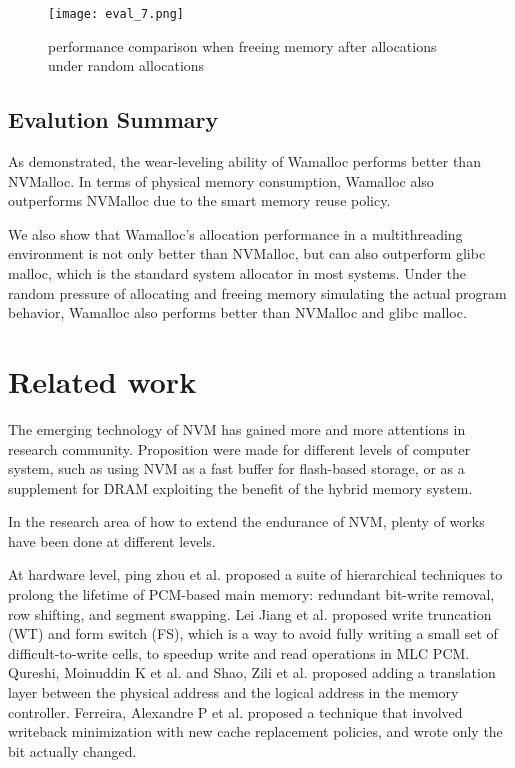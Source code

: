 \documentclass[10pt, conference, compsocconf]{IEEEtran}
\begin{document}
\begin{figure}[t]
\centering
\texttt{[image: eval\_7.png]}
\caption{performance comparison when freeing memory after allocations under random allocations}
\label{fig:eval_7}
\end{figure}

\subsection{Evalution Summary}

As demonstrated, 
the wear-leveling ability of Wamalloc performs better than NVMalloc.
In terms of physical memory consumption, Wamalloc also outperforms NVMalloc
due to the smart memory reuse policy.

We also show that Wamalloc's allocation performance in a multithreading environment is not only better than NVMalloc,
but can also outperform glibc malloc, which is the standard system allocator in most systems.
Under the random pressure of allocating and freeing memory simulating the actual program behavior,
Wamalloc also performs better than NVMalloc and glibc malloc.

\section{Related work}

The emerging technology of NVM has gained more and more attentions in research community.
Proposition were made for different levels of computer system, 
such as using NVM as a fast buffer for flash-based storage\cite{greenan2007prims}, 
or as a supplement for DRAM exploiting the benefit of the hybrid memory system.

In the research area of how to extend the endurance of NVM,
plenty of works have been done at different levels.

At hardware level, ping zhou et al.\cite{zhou2009durable} proposed a suite of hierarchical techniques to
prolong the lifetime of PCM-based main memory: 
redundant bit-write removal, row shifting, and segment swapping.
Lei Jiang et al.\cite{jiang2012improving} proposed write truncation (WT) and form switch (FS),
which is a way to avoid fully writing a small set of difficult-to-write cells, to speedup write and read operations in MLC PCM.
Qureshi, Moinuddin K et al.\cite{qureshi2009enhancing} and Shao, Zili et al.\cite{shao2012ptl} proposed adding a translation layer
between the physical address and the logical address in the memory controller.
Ferreira, Alexandre P et al.\cite{ferreira2010increasing} proposed a technique that involved 
writeback minimization with new cache replacement policies, and wrote only the bit actually changed.
\end{document}
